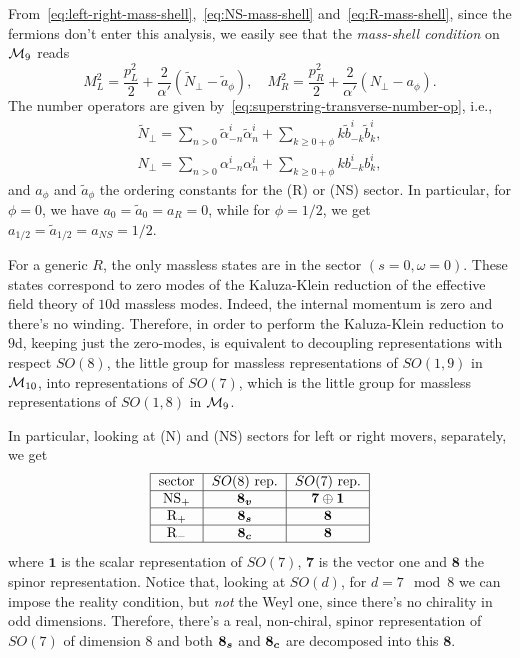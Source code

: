 From~\eqref{eq:left-right-mass-shell},~\eqref{eq:NS-mass-shell} and~\eqref{eq:R-mass-shell}, since the fermions don't enter this analysis, we easily see that the \emph{mass-shell condition} on $\mathcal{M}_9$ reads
\begin{equation}
    M^2_L = \frac{p^2_L}{2} + \frac{2}{\alpha'} \left( \tilde{N}_\perp - \tilde{a}_\phi \right), \quad M^2_R = \frac{p^2_R}{2} + \frac{2}{\alpha'} \left( {N}_\perp - {a}_\phi \right).
\end{equation}
The number operators are given by~\eqref{eq:superstring-transverse-number-op}, i.e.,
\begin{equation}
    \begin{aligned}
        \tilde{N}_\perp = \sum_{n > 0} \tilde{\alpha}_{-n}^i \tilde{\alpha}^i_n + \sum_{k \geq 0 + \phi} k \tilde{b}^i_{-k} \tilde{b}^i_k , \\
        N_\perp = \sum_{n > 0} \alpha_{-n}^i \alpha^i_n + \sum_{k \geq 0 + \phi} k b^i_{-k} b^i_k ,
\end{aligned}
\end{equation}
and $a_\phi$ and $\tilde{a}_\phi$ the ordering constants for the (R) or (NS) sector. In particular, for $\phi = 0$, we have $a_0 = \tilde{a}_0 = a_{R} = 0$, while for $\phi = 1/2$, we get $a_{1/2} = \tilde{a}_{1/2} = a_{NS} = 1/2$.

For a generic $R$, the only massless states are in the sector $(s=0,\omega=0)$. These states correspond to zero modes of the Kaluza-Klein reduction of the effective field theory of $10$d massless modes. Indeed, the internal momentum is zero and there's no winding. Therefore, in order to perform the Kaluza-Klein reduction to $9$d, keeping just the zero-modes, is equivalent to decoupling representations with respect $SO(8)$, the little group for massless representations of $SO(1,9)$ in $\mathcal{M}_{10}$, into representations of $SO(7)$, which is the little group for massless representations of $SO(1,8)$ in $\mathcal{M}_9$.

In particular, looking at (N) and (NS) sectors for left or right movers, separately, we get
\begin{equation}
        \begin{tabular}{|c|c|c|}
     \hline   sector & $SO(8)$ rep. & $SO(7)$ rep.    \\ \hline
        NS$_+$ & $\v$ & $\boldsymbol{7} \oplus \boldsymbol{1}$ \\ \hline
        R$_+$  & $\s$ &$ \boldsymbol{8}  $  \\ \hline
        R$_-$  & $\c$ & $\boldsymbol{8} $ \\\hline                                                
        \end{tabular}
\end{equation}
where $\boldsymbol{1}$ is the scalar representation of $SO(7)$, $\boldsymbol{7}$ is the vector one and $\boldsymbol{8}$ the spinor representation. Notice that, looking at $SO(d)$, for $d = 7 \mod 8$ we can impose the reality condition, but \emph{not} the Weyl one, since there's no chirality in odd dimensions. Therefore, there's a real, non-chiral, spinor representation of $SO(7)$ of dimension $8$ and both $\boldsymbol{8_s}$ and $\boldsymbol{8_c}$ are decomposed into this $\boldsymbol{8}$.

